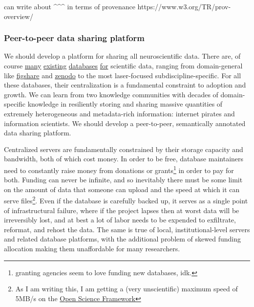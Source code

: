 \documentclass{article}
\begin{document}
\begin{leftbar}
\begin{leftbar}
\begin{leftbar}
can write about \^{}\^{}\^{} in terms of provenance
https://www.w3.org/TR/prov-overview/
\end{leftbar}
\end{leftbar}
\end{leftbar}

\hypertarget{peer-to-peer-data-sharing-platform}{%
\subsubsection{Peer-to-peer data sharing
platform}\label{peer-to-peer-data-sharing-platform}}

We should develop a platform for sharing all neuroscientific data. There
are, of course \href{https://www.dandiarchive.org/}{many}
\href{https://openneuro.org/}{existing}
\href{https://www.brainminds.riken.jp/}{databases}
\href{https://biccn.org/}{for} scientific data, ranging from
domain-general like \href{https://figshare.com/}{figshare} and
\href{https://zenodo.org/}{zenodo} to the most laser-focused
subdiscipline-specific. For all these databases, their centralization is
a fundamental constraint to adoption and growth. We can learn from two
knowledge communities with decades of domain-specific knowledge in
resiliently storing and sharing massive quantities of extremely
heterogeneous and metadata-rich information: internet pirates and
information scientists. We should develop a peer-to-peer, semantically
annotated data sharing platform.

Centralized servers are fundamentally constrained by their storage
capacity and bandwidth, both of which cost money. In order to be free,
database maintainers need to constantly raise money from donations or
grants\footnote{granting agencies seem to love funding new databases,
  idk.} in order to pay for both. Funding can never be infinite, and so
inevitably there must be some limit on the amount of data that someone
can upload and the speed at which it can serve files\footnote{As I am
  writing this, I am getting a (very unscientific) maximum speed of
  5MB/s on the \href{https://osf.io}{Open Science Framework}}. Even if
the database is carefully backed up, it serves as a single point of
infrastructural failure, where if the project lapses then at worst data
will be irreversibly lost, and at best a lot of labor needs to be
expended to exfiltrate, reformat, and rehost the data. The same is true
of local, institutional-level servers and related database platforms,
with the additional problem of skewed funding allocation making them
unaffordable for many researchers.
\end{document}
